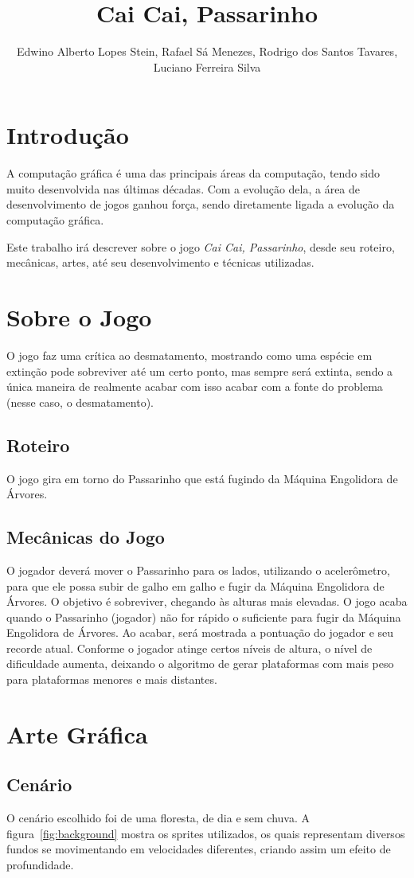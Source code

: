 \documentclass[12pt]{article}
\title{Cai Cai, Passarinho}
\author{Edwino Alberto Lopes Stein\inst{1}, Rafael Sá Menezes\inst{1},
Rodrigo dos Santos Tavares\inst{1}, \\Luciano Ferreira Silva\inst{1} }
\begin{document}
\maketitle

\section{Introdução}
	A computação gráfica é uma das principais áreas da computação, tendo sido muito desenvolvida nas últimas décadas. Com a evolução dela, a área de desenvolvimento de jogos ganhou força, sendo diretamente ligada a evolução da computação gráfica.
	
	Este trabalho irá descrever sobre o jogo \textit{Cai Cai, Passarinho}, desde seu roteiro, mecânicas, artes, até seu desenvolvimento e técnicas utilizadas.
	
\section{Sobre o Jogo}
	O jogo faz uma crítica ao desmatamento, mostrando como uma espécie em extinção pode sobreviver até um certo ponto, mas sempre será extinta, sendo a única maneira de realmente acabar com isso acabar com a fonte do problema (nesse caso, o desmatamento).
\subsection{Roteiro}
	O jogo gira em torno do Passarinho que está fugindo da Máquina Engolidora de Árvores. 
\subsection{Mecânicas do Jogo}
	O jogador deverá mover o Passarinho para os lados, utilizando o acelerômetro, para que ele possa subir de galho em galho e fugir da Máquina Engolidora de Árvores. O objetivo é sobreviver, chegando às alturas mais elevadas. O jogo acaba quando o Passarinho (jogador) não for rápido o suficiente para fugir da Máquina Engolidora de Árvores. Ao acabar, será mostrada a pontuação do jogador e seu recorde atual. Conforme o jogador atinge certos níveis de altura, o nível de dificuldade aumenta, deixando o algoritmo de gerar plataformas com mais peso para plataformas menores e mais distantes.

\section{Arte Gráfica}
\subsection{Cenário}
	O cenário escolhido foi de uma floresta, de dia e sem chuva. A figura~\ref{fig:background} mostra os sprites utilizados, os quais representam diversos fundos se movimentando em velocidades diferentes, criando assim um efeito de profundidade.
	
\end{document}
